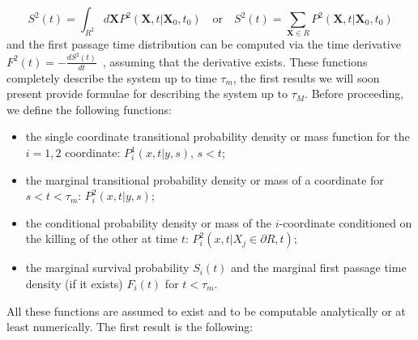 \documentclass[a4paper,11pt]{amsart}
\theoremstyle{remark}
\begin{document}
  \begin{equation*}
    S^2(t)=\int_{R^2}d\mathbf{X}P^2(\mathbf{X},t|\mathbf{X}_0,t_0)\quad \text{or}\quad S^2(t)=\sum_{\mathbf{X}\in R}P^2(\mathbf{X},t|\mathbf{X}_0,t_0)
  \end{equation*}
  and the first passage time distribution can be computed via the time derivative $F^2(t)=-\frac{dS^2(t)}{dt}$~\cite{redner_guide_2007}, assuming that the derivative exists. These functions completely describe the system up to time $\tau_m$, the first results we will soon present provide formulae for describing the system up to $\tau_M$. Before proceeding, we define the following functions:
  \begin{itemize}
  \item the single coordinate transitional probability density or mass function for the $i=1,2$ coordinate: $P^1_i(x,t|y,s),\,s<t$;
  \item the marginal transitional probability density or mass of a coordinate for $s<t<\tau_m$: $P^2_i(x,t|y,s)$;
  \item the conditional probability density or mass of the $i$-coordinate conditioned on the killing of the other at time $t$: $P^2_i(x,t|X_j \in \partial R,t)$;
  \item the marginal survival probability $S_i(t)$ and the marginal first passage time density (if it exists) $F_i(t)$ for $t<\tau_m$.
  \end{itemize}
  All these functions are assumed to exist and to be computable analytically or at least numerically. The first result is the following: 
  
\end{document}
